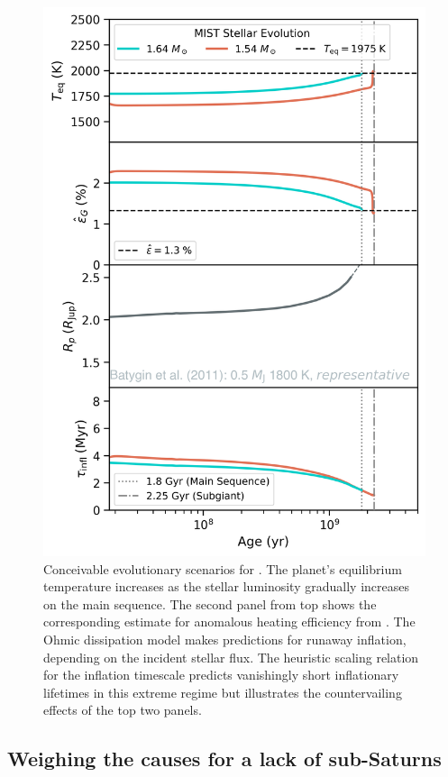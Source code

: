 \documentclass[twocolumn]{aastex631}
\newcommand{\hatpb}{\object{HAT-P-67 b}}
\begin{document}
\begin{figure}
    \includegraphics[width=\linewidth]{figures/reinflation_MIST2.png}
    \caption{Conceivable evolutionary scenarios for \hatpb.  The planet's equilibrium temperature increases as the stellar luminosity gradually increases on the main sequence.  The second panel from top shows the corresponding estimate for anomalous heating efficiency from \citet{2018AJ....155..214T}. The Ohmic dissipation model makes predictions for runaway inflation, depending on the incident stellar flux.  The heuristic scaling relation for the inflation timescale predicts vanishingly short inflationary lifetimes in this extreme regime but illustrates the countervailing effects of the top two panels.}
    \label{fig:OhmicInflate}
\end{figure}


\subsection{Weighing the causes for a lack of sub-Saturns}\label{secLackofSaturns}
\end{document}
